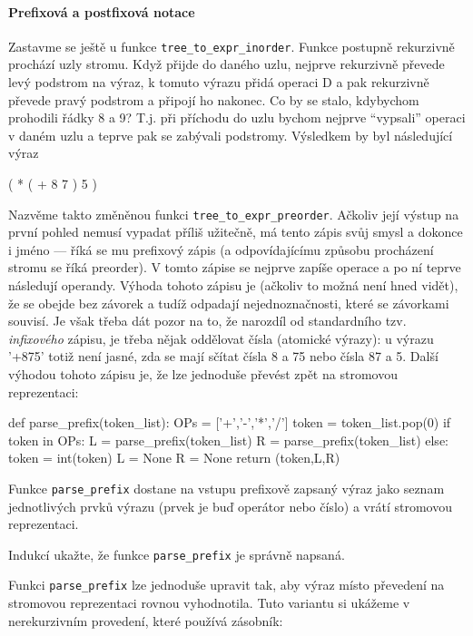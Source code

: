 \paragraph{Prefixová a postfixová notace} Zastavme se ještě u funkce
{\tt tree\_to\_expr\_inorder}. Funkce postupně rekurzivně prochází uzly stromu.
Když přijde do daného uzlu, nejprve rekurzivně převede levý podstrom na výraz,
k tomuto výrazu přidá operaci D a pak rekurzivně převede pravý podstrom a připojí
ho nakonec. Co by se stalo, kdybychom prohodili řádky 8 a 9?  T.j. při příchodu
do uzlu bychom nejprve ``vypsali'' operaci v daném uzlu a teprve pak se zabývali
podstromy. Výsledkem by byl následující výraz
\begin{center}
 ( * ( + 8 7 ) 5 )
\end{center}
Nazvěme takto změněnou funkci {\tt tree\_to\_expr\_preorder}. Ačkoliv její výstup
na první pohled nemusí vypadat příliš užitečně, má tento zápis
svůj smysl a dokonce i jméno --- říká se mu prefixový zápis (a odpovídajícímu 
způsobu procházení stromu se říká preorder). V tomto zápise se nejprve zapíše
operace a po ní teprve následují operandy. Výhoda tohoto zápisu je (ačkoliv to možná
není hned vidět), že se obejde bez závorek a tudíž odpadají nejednoznačnosti, 
které se závorkami souvisí. Je však třeba dát pozor na to, že narozdíl od 
standardního tzv. \emph{infixového} zápisu, je třeba nějak oddělovat čísla 
(atomické výrazy): u výrazu '+875' totiž není jasné, zda se mají
sčítat čísla 8 a 75 nebo čísla 87 a 5. Další výhodou tohoto zápisu je, že lze
jednoduše převést zpět na stromovou reprezentaci:

\begin{python}
def parse_prefix(token_list):
    OPs = ['+','-','*','/']
    token = token_list.pop(0)
    if token in OPs:
        L = parse_prefix(token_list)
        R = parse_prefix(token_list)
    else:
        token = int(token)
        L = None
        R = None
    return (token,L,R)
\end{python}

Funkce {\tt parse\_prefix} dostane na vstupu prefixově zapsaný výraz jako 
seznam jednotlivých prvků výrazu (prvek je buď operátor nebo číslo) a vrátí
stromovou reprezentaci. 

\begin{cviceni} Indukcí ukažte, že funkce {\tt parse\_prefix} je správně napsaná.
\end{cviceni}

Funkci {\tt parse\_prefix} lze jednoduše upravit tak, aby výraz místo převedení
na stromovou reprezentaci rovnou vyhodnotila. Tuto variantu si ukážeme v 
nerekurzivním provedení, které používá zásobník:

